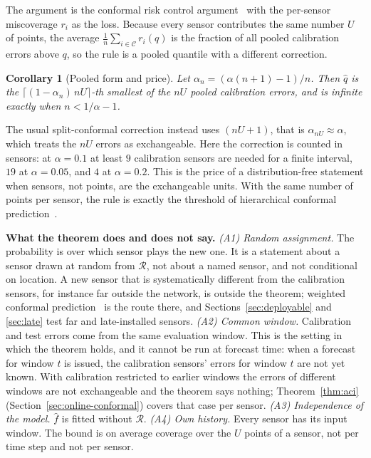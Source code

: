 \documentclass[journal,twoside,web]{ieeecolor}
\newtheorem{corollary}{Corollary}
\newcommand{\Risk}{r}
\begin{document}
The argument is the conformal risk control argument~\cite{crc2024} with the per-sensor miscoverage
$\Risk_i$ as the loss. Because every sensor contributes the same number $U$ of points, the average
$\frac1n\sum_{i\in\mathcal{C}}\Risk_i(q)$ is the fraction of all pooled calibration errors above $q$,
so the rule is a pooled quantile with a different correction.

\begin{corollary}[Pooled form and price]
\label{cor:pooled}
Let $\alpha_n=(\alpha(n+1)-1)/n$. Then $\hat q$ is the $\lceil(1-\alpha_n)\,nU\rceil$-th smallest of the
$nU$ pooled calibration errors, and is infinite exactly when $n<1/\alpha-1$.
\end{corollary}
The usual split-conformal correction instead uses $(nU+1)$, that is $\alpha_{nU}\approx\alpha$, which
treats the $nU$ errors as exchangeable. Here the correction is counted in sensors: at $\alpha=0.1$ at
least $9$ calibration sensors are needed for a finite interval, $19$ at $\alpha=0.05$, and $4$ at
$\alpha=0.2$. This is the price of a distribution-free statement when sensors, not points, are
the exchangeable units. With the same number of points per sensor, the rule is exactly the threshold of
hierarchical conformal prediction~\cite{lee2023hcp}.

\textbf{What the theorem does and does not say.}
\emph{(A1) Random assignment.} The probability is over which sensor plays the new one. It is a
statement about a sensor drawn at random from $\mathcal{R}$, not about a named sensor, and not
conditional on location.  A new sensor that is systematically different
from the calibration sensors, for instance far outside the network, is outside the theorem;
weighted conformal prediction~\cite{tibshirani2019covshift,barber2023nexcp} is the route there, and
Sections~\ref{sec:deployable} and \ref{sec:late} test far and late-installed sensors.
\emph{(A2) Common window.} Calibration and test errors come from the same evaluation window. This is
the setting in which the theorem holds, and it cannot be run at forecast time: when a forecast for
window $t$ is issued, the calibration sensors' errors for window $t$ are not yet known. With
calibration restricted to earlier windows the errors of different windows are not exchangeable and the
theorem says nothing; Theorem~\ref{thm:aci} (Section~\ref{sec:online-conformal}) covers that case per sensor.
\emph{(A3) Independence of the model.} $\hat f$ is fitted without $\mathcal{R}$.
\emph{(A4) Own history.} Every sensor has its input window.
The bound is on average coverage over the $U$ points of a sensor, not per time step and not per sensor.
\end{document}
